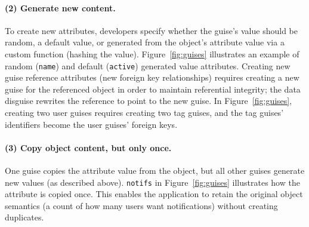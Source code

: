 \paragraph{(2) Generate new content.}
%
To create new attributes, developers specify whether the guise's value should be random,
a default value, or generated from the object's attribute value via a custom function (\eg hashing 
the value).
%
Figure~\ref{fig:guises} illustrates an example of random (\texttt{name}) and default
(\texttt{active}) generated value attributes.
%
%
Creating new guise reference attributes (\eg new foreign key relationships) requires
creating a new guise for the referenced object in order to maintain referential
integrity;
the data disguise rewrites the reference to point to the new guise.
%
In Figure~\ref{fig:guises}, creating two user guises requires creating two
tag guises, and the tag guises' identifiers become the user guises' foreign keys.
%

\paragraph{(3) Copy object content, but only once.}
%
One guise copies the attribute value from the object, but all other guises generate new
values (as described above).
%
\texttt{notifs} in Figure~\ref{fig:guises} illustrates how the attribute is copied once.
%
This enables the application to retain the original object semantics (\eg a count of how many
users want notifications) without creating duplicates.
%

